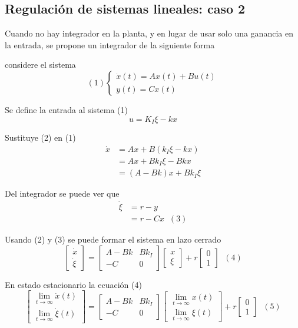\subsection{Regulación de sistemas lineales: caso 2}

Cuando no hay integrador en la planta, y en lugar de usar solo una ganancia en la entrada, se propone un integrador de la siguiente forma

considere el sistema 
\[
    (1)
    \left\{
        \begin{array}{lll}
            \dot{x}(t) = Ax(t) + Bu(t)\\
            y(t) = Cx(t)
        \end{array}
    \right.
\]

Se define la entrada al sistema (1)
\[
    u = K_{I}\xi - kx
\]

Sustituye (2) en (1)
\[
    \begin{split}
        \dot{x} & = Ax + B(k_{I}\xi - kx) \\
        & = Ax + Bk_{I}\xi - Bkx \\
        & = (A-Bk)x + Bk_{I}\xi
    \end{split}
\]

Del integrador se puede ver que
\[
    \begin{split}
       \dot{\xi} & = r - y \\
       & = r - Cx \;\; (3) 
    \end{split}
\]

Usando (2) y (3) se puede formar el sistema en lazo cerrado
\[
    \begin{bmatrix}
        \dot{x} \\ \dot{\xi}
    \end{bmatrix} = 
    \begin{bmatrix}
        A-Bk & Bk_{I} \\
        -C & 0
    \end{bmatrix}
    \begin{bmatrix}
        x \\ \xi
    \end{bmatrix} + r
    \begin{bmatrix}
        0 \\ 1
    \end{bmatrix} \;\; (4)
\]

En estado estacionario la ecuación (4)
\[
    \begin{bmatrix}
        \lim_{t \to \infty}\dot{x}(t) \\
        \lim_{t \to \infty}\dot{\xi}(t)
    \end{bmatrix} = 
    \begin{bmatrix}
        A-Bk & Bk_{I} \\
        -C & 0
    \end{bmatrix}
    \begin{bmatrix}
        \lim_{t \to \infty}x(t) \\ 
        \lim_{t \to \infty}\xi(t)
    \end{bmatrix} + r
    \begin{bmatrix}
        0 \\ 1
    \end{bmatrix} \;\; (5)
\]

